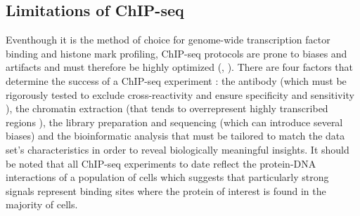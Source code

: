\subsection{Limitations of ChIP-seq}
Eventhough it is the method of choice for genome-wide transcription factor binding and histone mark profiling, ChIP-seq protocols are prone to biases and artifacts and must therefore be highly optimized (, ). There are four factors that determine the success of a ChIP-seq experiment \citep{Liu2010, Chen2012}: the antibody (which must be rigorously tested to exclude cross-reactivity and ensure specificity and sensitivity \citep{Landt2012}), the chromatin extraction (that tends to overrepresent highly transcribed regions \citep{Waldminghaus2010, Teytelman2013}), the library preparation and sequencing (which can introduce several biases) and the bioinformatic analysis that must be tailored to match the data set’s characteristics in order to reveal biologically meaningful insights. It should be noted that all ChIP-seq experiments to date reflect the protein-DNA interactions of a population of cells which suggests that particularly strong signals represent binding sites where the protein of interest is found in the majority of cells.\\
%

%
